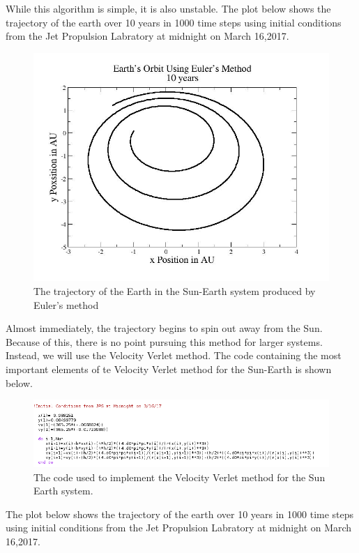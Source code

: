 \documentclass[%
oneside,                 %
final,                   %
10pt]{article}
\begin{document}
While this algorithm is simple, it is also unstable.  The plot below shows the trajectory of the earth over 10 years in 1000 time steps using initial conditions from the Jet Propulsion Labratory \cite{JPL} at midnight on March 16,2017.

\begin{figure}[H]\label{fig:eulerplot}
  \centering
    \includegraphics[width=1.0\textwidth]{Euler.jpg}
    \caption{The trajectory of the Earth in the Sun-Earth system produced by Euler's method}
\end{figure}

Almost immediately, the trajectory begins to spin out away from the Sun.  Because of this, there is no point pursuing this method for larger systems.  Instead, we will use the Velocity Verlet method.  The code containing the most important elements of te Velocity Verlet method for the Sun-Earth is shown below.

\begin{figure}[H]\label{fig:velcode}
  \centering
    \includegraphics[width=1.0\textwidth]{VelCode.png}
    \caption{The code used to implement the Velocity Verlet method for the Sun Earth system.}
\end{figure}

The plot below shows the trajectory of the earth over 10 years in 1000 time steps using initial conditions from the Jet Propulsion Labratory at midnight on March 16,2017.
\end{document}
